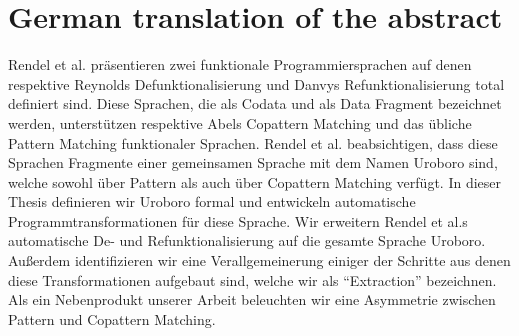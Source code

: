 \chapter{German translation of the abstract}

Rendel et al. präsentieren zwei funktionale Programmiersprachen auf denen respektive Reynolds Defunktionalisierung und Danvys Refunktionalisierung total definiert sind. Diese Sprachen, die als Codata und als Data Fragment bezeichnet werden, unterstützen respektive Abels Copattern Matching und das übliche Pattern Matching funktionaler Sprachen. Rendel et al. beabsichtigen, dass diese Sprachen Fragmente einer gemeinsamen Sprache mit dem Namen Uroboro sind, welche sowohl über Pattern als auch über Copattern Matching verfügt. In dieser Thesis definieren wir Uroboro formal und entwickeln automatische Programmtransformationen für diese Sprache. Wir erweitern Rendel et al.s automatische De- und Refunktionalisierung auf die gesamte Sprache Uroboro. Außerdem identifizieren wir eine Verallgemeinerung einiger der Schritte aus denen diese Transformationen aufgebaut sind, welche wir als ``Extraction'' bezeichnen. Als ein Nebenprodukt unserer Arbeit beleuchten wir eine Asymmetrie zwischen Pattern und Copattern Matching.
